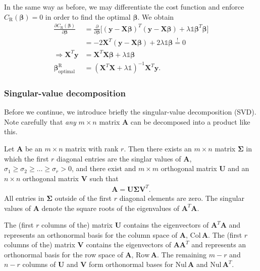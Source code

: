 \documentclass[a4paper, twocolumn]{article}
\begin{document}
In the same way as before, we may differentiate the cost function and enforce $C_\text{R}(\bm\beta)=0$ in order to find the optimal $\bm\beta$. We obtain
\begin{align}
\frac{\partial C_\text{R}(\bm\beta)}{\partial \bm\beta} &= \frac{\partial}{\partial \bm\beta} \Big[(\mathbf{y}-\mathbf{X}\bm\beta)^T (\mathbf{y}-\mathbf{X}\bm\beta) + \lambda \mathds{1} \bm\beta^T\bm\beta\Big] \nonumber \\
%
&= -2\mathbf{X}^T(\mathbf{y}-\mathbf{X}\bm\beta) +2\lambda\mathds{1}\bm\beta \stackrel{!}{=} 0 \nonumber \\
%
\Rightarrow \mathbf{X}^T\mathbf{y} &= \mathbf{X}^T\mathbf{X}\bm\beta +\lambda \mathds{1} \bm\beta \nonumber \\
%
\bm\beta^\text{R}_\text{optimal} &= \left(\mathbf{X}^T\mathbf{X}+\lambda\mathds{1}\right)^{-1}\mathbf{X}^T\mathbf{y}. \label{eq:ridgebeta}
\end{align}

\subsubsection{Singular-value decomposition \label{sect:svd}}
Before we continue, we introduce briefly the singular-value decomposition (SVD). Note carefully that \textit{any} $m\times n$ matrix $\mathbf{A}$ can be decomposed into a product like this. 
\begin{grayframe}
Let $\mathbf{A}$ be an $m\times n$ matrix with rank $r$. Then there exists an $m\times n$ matrix $\bm{\Sigma}$ in which the first $r$ diagonal entries are the singlar values of $\mathbf{A}$, $\sigma_1\ge\sigma_2\ge\dots\ge\sigma_r>0$, and there exist and $m\times m$ orthogonal matrix $\mathbf{U}$ and an $n\times n$ orthogonal matrix $\mathbf{V}$ such that 
\begin{align}
\mathbf{A}=\mathbf{U}\bm\Sigma \mathbf{V}^T.
\end{align}
All entries in $\bm \Sigma$ outside of the first $r$ diagonal elements are zero. The singular values of $\mathbf{A}$ denote the square roots of the eigenvalues of $\mathbf{A}^T\mathbf{A}$.\autocite{lay2012linear}
\end{grayframe}
The (first $r$ columns of the) matrix $\mathbf{U}$ contains the eigenvectors of $\mathbf{A}^T\mathbf{A}$ and represents an orthonormal basis for the column space of $\mathbf{A}$, $\text{Col}\,\mathbf{A}$. The (first $r$ columns of the) matrix $\mathbf{V}$ contains the eigenvectors of $\mathbf{A}\mathbf{A}^T$ and represents an orthonormal basis for the row space of $\mathbf{A}$, $\text{Row}\,\mathbf{A}$. The remaining $m-r$ and $n-r$ columns of $\mathbf{U}$ and $\mathbf{V}$ form orthonormal bases for $\text{Nul}\,\mathbf{A}$ and $\text{Nul}\,\mathbf{A}^T$.
\end{document}
